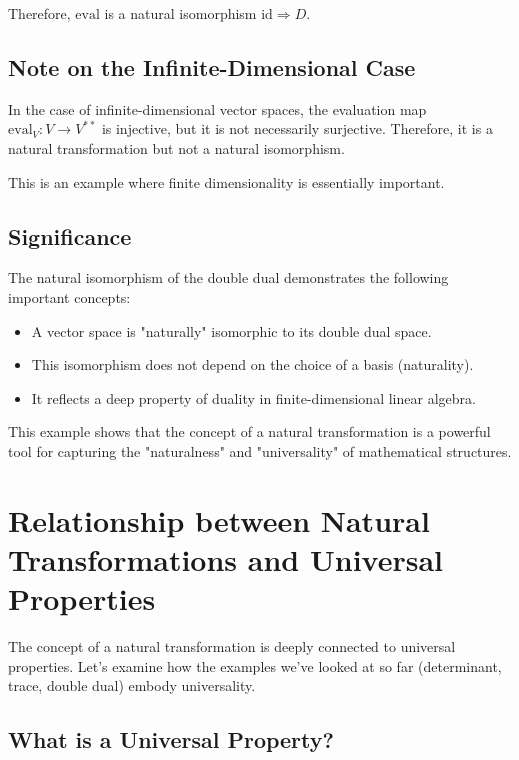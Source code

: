 \documentclass[uplatex,a4j,12pt,dvipdfmx]{jsarticle}
\begin{document}
Therefore, $\mathrm{eval}$ is a natural isomorphism $\mathrm{id} \Rightarrow D$.

\subsection{Note on the Infinite-Dimensional Case}

In the case of infinite-dimensional vector spaces, the evaluation map $\mathrm{eval}_V: V \to V^{**}$ is injective, but it is not necessarily surjective. Therefore, it is a natural transformation but not a natural isomorphism.

This is an example where finite dimensionality is essentially important.

\subsection{Significance}

The natural isomorphism of the double dual demonstrates the following important concepts:
\begin{itemize}
	\item A vector space is "naturally" isomorphic to its double dual space.
	\item This isomorphism does not depend on the choice of a basis (naturality).
	\item It reflects a deep property of duality in finite-dimensional linear algebra.
\end{itemize}

This example shows that the concept of a natural transformation is a powerful tool for capturing the "naturalness" and "universality" of mathematical structures.







\section{Relationship between Natural Transformations and Universal Properties}

The concept of a natural transformation is deeply connected to universal properties. Let's examine how the examples we've looked at so far (determinant, trace, double dual) embody universality.

\subsection{What is a Universal Property?}
\end{document}
